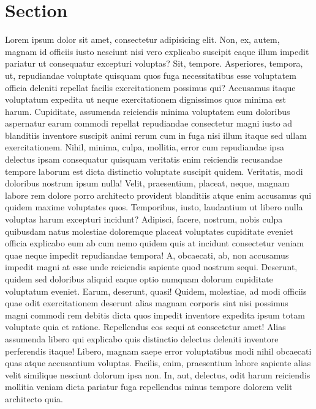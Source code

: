 \documentclass{article}
\begin{document}
\tableofcontents
\newpage


\section{Section}
Lorem ipsum dolor sit amet, consectetur adipisicing elit. Non, ex, autem, magnam id officiis iusto nesciunt nisi vero explicabo suscipit eaque illum impedit pariatur ut consequatur excepturi voluptas? Sit, tempore.
Asperiores, tempora, ut, repudiandae voluptate quisquam quos fuga necessitatibus esse voluptatem officia deleniti repellat facilis exercitationem possimus qui? Accusamus itaque voluptatum expedita ut neque exercitationem dignissimos quos minima est harum.
Cupiditate, assumenda reiciendis minima voluptatem eum doloribus aspernatur earum commodi repellat repudiandae consectetur magni iusto ad blanditiis inventore suscipit animi rerum cum in fuga nisi illum itaque sed ullam exercitationem.
Nihil, minima, culpa, mollitia, error cum repudiandae ipsa delectus ipsam consequatur quisquam veritatis enim reiciendis recusandae tempore laborum est dicta distinctio voluptate suscipit quidem. Veritatis, modi doloribus nostrum ipsum nulla!
Velit, praesentium, placeat, neque, magnam labore rem dolore porro architecto provident blanditiis atque enim accusamus qui quidem maxime voluptates quos. Temporibus, iusto, laudantium ut libero nulla voluptas harum excepturi incidunt?
Adipisci, facere, nostrum, nobis culpa quibusdam natus molestiae doloremque placeat voluptates cupiditate eveniet officia explicabo eum ab cum nemo quidem quis at incidunt consectetur veniam quae neque impedit repudiandae tempora!
A, obcaecati, ab, non accusamus impedit magni at esse unde reiciendis sapiente quod nostrum sequi. Deserunt, quidem sed doloribus aliquid eaque optio numquam dolorum cupiditate voluptatum eveniet. Earum, deserunt, quasi!
Quidem, molestiae, ad modi officiis quae odit exercitationem deserunt alias magnam corporis sint nisi possimus magni commodi rem debitis dicta quos impedit inventore expedita ipsum totam voluptate quia et ratione.
Repellendus eos sequi at consectetur amet! Alias assumenda libero qui explicabo quis distinctio delectus deleniti inventore perferendis itaque! Libero, magnam saepe error voluptatibus modi nihil obcaecati quas atque accusantium voluptas.
Facilis, enim, praesentium labore sapiente alias velit similique nesciunt dolorum ipsa non. In, aut, delectus, odit harum reiciendis mollitia veniam dicta pariatur fuga repellendus minus tempore dolorem velit architecto quia.
\end{document}
